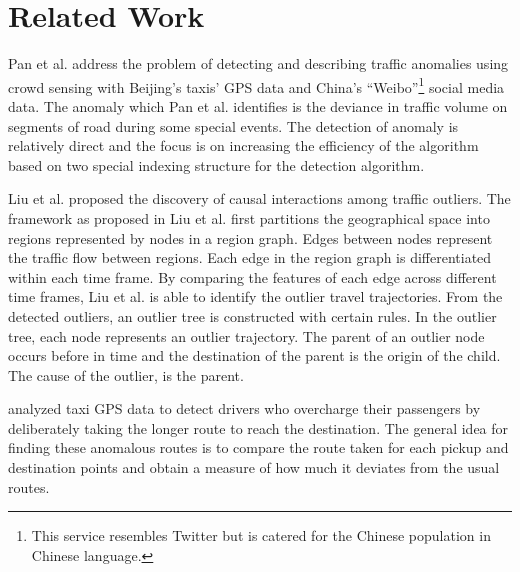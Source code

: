 \documentclass{sig-alternate}
\begin{document}

\section{Related Work}
\label{sec:related}


Pan et al. \cite{Pan2013} address the problem of detecting and describing traffic anomalies using crowd sensing with Beijing's taxis' GPS data and China's ``Weibo''\footnote{This service resembles Twitter but is catered for the Chinese population in Chinese language.} social media data. The anomaly which Pan et al. \cite{Pan2013} identifies is the deviance in traffic volume on segments of road during some special events. The detection of anomaly is relatively direct and the focus is on increasing the efficiency of the algorithm based on two special indexing structure for the detection algorithm.

Liu et al. \cite{Liu2011} proposed the discovery of causal interactions among traffic outliers. The framework as proposed in Liu et al.\cite{Liu2011} first partitions the geographical space into regions represented by nodes in a region graph. Edges between nodes represent the traffic flow between regions. Each edge in the region graph is differentiated within each time frame. By comparing the features of each edge across different time frames, Liu et al. is able to identify the outlier travel trajectories. From the detected outliers, an outlier tree is constructed with certain rules. In the outlier tree, each node represents an outlier trajectory. The parent of an outlier node occurs before in time and the destination of the parent is the origin of the child. The cause of the outlier, is the parent.

\cite{Ge2011,Zhang2011,Zhang2012} analyzed taxi GPS data to detect drivers who overcharge their passengers by deliberately taking the longer route to reach the destination. The general idea for finding these anomalous routes is to compare the route taken for each pickup and destination points and obtain a measure of how much it deviates from the usual routes.
\end{document}
